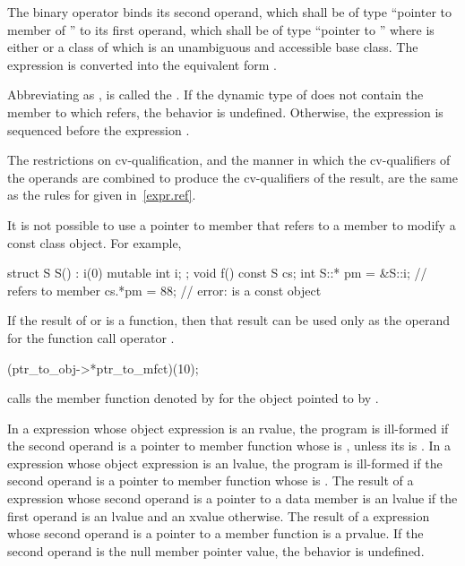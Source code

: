 \pnum
The binary operator \tcode{->*} binds its second operand, which shall be
of type ``pointer to member of '' to its first operand, which shall be of
type ``pointer to ''
where  is either  or
a class of which 
is an unambiguous and accessible base class.
The expression  is converted into the equivalent form
.

\pnum
Abbreviating  as , 
is called the .
If the dynamic type of  does not
contain the member to which
 refers, the behavior is undefined.
Otherwise, the expression  is sequenced before the expression .

\pnum
The restrictions on cv-qualification, and the manner in which
the cv-qualifiers of the operands are combined to produce the
cv-qualifiers of the result, are the same as the rules for
 given in~\ref{expr.ref}.
\begin{note}
It is not possible to use a pointer to member that refers to a
 member to modify a const class object. For
example,
\begin{codeblock}
struct S {
  S() : i(0) { }
  mutable int i;
};
void f()
{
  const S cs;
  int S::* pm = &S::i;          //  refers to  member 
  cs.*pm = 88;                  // error:  is a const object
}
\end{codeblock}
\end{note}

\pnum
{}%
If the result of  or \tcode{->*} is a function, then that
result can be used only as the operand for the function call operator
\tcode{()}.
\begin{example}
\begin{codeblock}
(ptr_to_obj->*ptr_to_mfct)(10);
\end{codeblock}
calls the member function denoted by  for the object
pointed to by .
\end{example}
In a  expression whose object expression is an rvalue, the program is
ill-formed if the second operand is a pointer to member function
whose  is \tcode{\&},
unless its  is .
In a 
expression whose object expression is an lvalue, the program is ill-formed if the second
operand is
a pointer to member function
whose  is \tcode{\&\&}.
The result of a  expression
whose second operand is a pointer to a data member is an lvalue if the first
operand is an lvalue and an xvalue otherwise. The result of a  expression whose
second operand is a pointer to a member function is a prvalue.
If the second operand is the null
member pointer value, the behavior is undefined.

